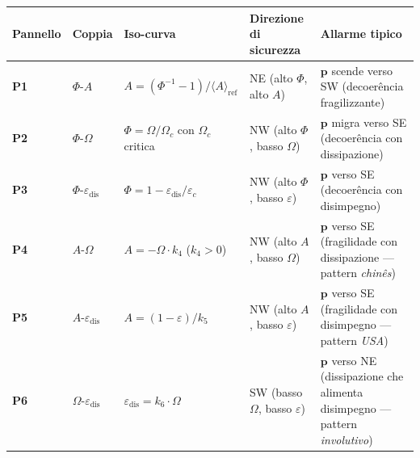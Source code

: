 {\def\LTcaptype{none} %
{\small\begin{longtable}[]{@{}
  >{\raggedright\arraybackslash}p{}
  >{\raggedright\arraybackslash}p{}
  >{\raggedright\arraybackslash}p{}
  >{\raggedright\arraybackslash}p{}
  >{\raggedright\arraybackslash}p{}@{}}
\toprule\noalign{}
\begin{minipage}[b]{\linewidth}\raggedright
Pannello
\end{minipage} & \begin{minipage}[b]{\linewidth}\raggedright
Coppia
\end{minipage} & \begin{minipage}[b]{\linewidth}\raggedright
Iso-curva
\end{minipage} & \begin{minipage}[b]{\linewidth}\raggedright
Direzione di sicurezza
\end{minipage} & \begin{minipage}[b]{\linewidth}\raggedright
Allarme tipico
\end{minipage} \\
\midrule\noalign{}
\endhead
\bottomrule\noalign{}
\endlastfoot
\textbf{P1} & \(\Phi\)-\(A\) &
\(A = (\Phi^{-1} - 1)/\langle A\rangle_{\text{ref}}\) & NE (alto
\(\Phi\), alto \(A\)) & \(\boldsymbol{p}\) scende verso SW (decoerência
fragilizzante) \\
\textbf{P2} & \(\Phi\)-\(\Omega\) & \(\Phi = \Omega/\Omega_c\) con
\(\Omega_c\) critica & NW (alto \(\Phi\), basso \(\Omega\)) &
\(\boldsymbol{p}\) migra verso SE (decoerência con dissipazione) \\
\textbf{P3} & \(\Phi\)-\(\varepsilon_{\text{dis}}\) &
\(\Phi = 1 - \varepsilon_{\text{dis}}/\varepsilon_c\) & NW (alto
\(\Phi\), basso \(\varepsilon\)) & \(\boldsymbol{p}\) verso SE
(decoerência con disimpegno) \\
\textbf{P4} & \(A\)-\(\Omega\) & \(A = -\Omega \cdot k_4\) (\(k_4 > 0\))
& NW (alto \(A\), basso \(\Omega\)) & \(\boldsymbol{p}\) verso SE
(fragilidade con dissipazione --- pattern \emph{chinês}) \\
\textbf{P5} & \(A\)-\(\varepsilon_{\text{dis}}\) &
\(A = (1 - \varepsilon)/k_5\) & NW (alto \(A\), basso \(\varepsilon\)) &
\(\boldsymbol{p}\) verso SE (fragilidade con disimpegno --- pattern
\emph{USA}) \\
\textbf{P6} & \(\Omega\)-\(\varepsilon_{\text{dis}}\) &
\(\varepsilon_{\text{dis}} = k_6 \cdot \Omega\) & SW (basso \(\Omega\),
basso \(\varepsilon\)) & \(\boldsymbol{p}\) verso NE (dissipazione che
alimenta disimpegno --- pattern \emph{involutivo}) \\
\end{longtable}}
}

